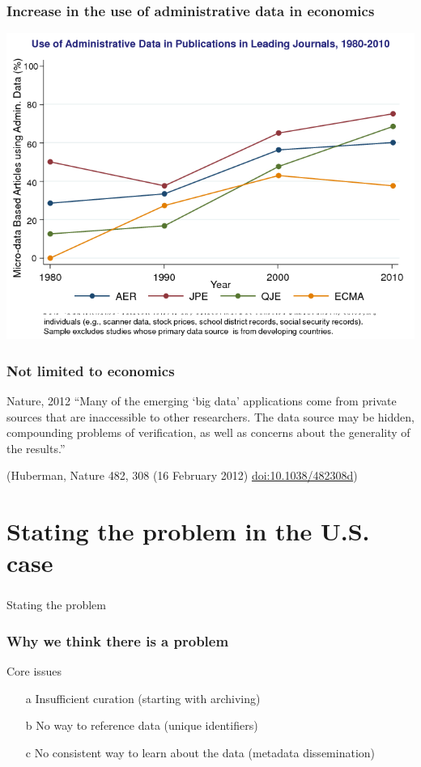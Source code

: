 \begin{frame}
\frametitle{Increase in the use of administrative data in economics}
%
\includegraphics[width=0.8\paperwidth]{ChettySlide2}
\end{frame}

\begin{frame}
\frametitle{Not limited to economics}
\begin{block}{Nature, 2012}
``Many of the emerging `big data' applications come from private sources that are inaccessible to other researchers. The data source may be hidden, compounding problems of verification, as well as concerns about the generality of the results.''\\
\end{block}
\tiny (Huberman, Nature 482, 308 (16 February 2012) \href{http://dx.doi.org/10.1038/482308d}{doi:10.1038/482308d})
\end{frame}

\section[Problem]{Stating the problem in the U.S. case}
\begin{frame}
\frametitle{}
\begin{block}{Stating the problem}

\end{block}
\end{frame}

\begin{frame}
\frametitle{Why we think there is a problem}
\begin{block}{Core issues}
\begin{itemize}
\item[a] Insufficient curation (starting with archiving)
\item[b] No way to reference data (unique identifiers)
\item[c] No consistent way to learn about the data (metadata dissemination)
\end{itemize}
\end{block}
\end{frame}

